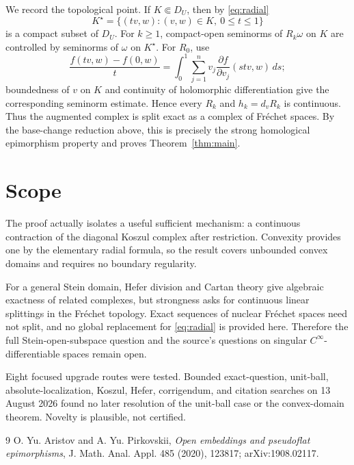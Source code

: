 \documentclass[11pt]{article}
\begin{document}
We record the topological point.  If $K\Subset D_U$, then by
\eqref{eq:radial}
\[
 K^\star=\{(tv,w):(v,w)\in K,\ 0\le t\le1\}
\]
is a compact subset of $D_U$.  For $k\ge1$, compact-open seminorms of
$R_k\omega$ on $K$ are controlled by seminorms of $\omega$ on $K^\star$.
For $R_0$, use
\[
 \frac{f(tv,w)-f(0,w)}t
 =\int_0^1\sum_{j=1}^nv_j
       \frac{\partial f}{\partial v_j}(stv,w)\,ds;
\]
boundedness of $v$ on $K$ and continuity of holomorphic differentiation give
the corresponding seminorm estimate.  Hence every $R_k$ and
$h_k=d_vR_k$ is continuous.  Thus the augmented complex is split exact as a
complex of Fréchet spaces.  By the base-change reduction above, this is
precisely the strong homological epimorphism property and proves
Theorem~\ref{thm:main}.

\section{Scope}

The proof actually isolates a useful sufficient mechanism: a continuous
contraction of the diagonal Koszul complex after restriction.  Convexity
provides one by the elementary radial formula, so the result covers
unbounded convex domains and requires no boundary regularity.

For a general Stein domain, Hefer division and Cartan theory give algebraic
exactness of related complexes, but strongness asks for continuous linear
splittings in the Fréchet topology.  Exact sequences of nuclear Fréchet
spaces need not split, and no global replacement for \eqref{eq:radial} is
provided here.  Therefore the full Stein-open-subspace question and the
source's questions on singular $C^\infty$-differentiable spaces remain open.

Eight focused upgrade routes were tested.  Bounded exact-question,
unit-ball, absolute-localization, Koszul, Hefer, corrigendum, and citation
searches on 13 August 2026 found no later resolution of the unit-ball case or
the convex-domain theorem.  Novelty is plausible, not certified.

\begin{thebibliography}{9}
O. Yu. Aristov and A. Yu. Pirkovskii,
\emph{Open embeddings and pseudoflat epimorphisms},
J. Math. Anal. Appl. 485 (2020), 123817;
arXiv:1908.02117.
\end{thebibliography}
\end{document}
